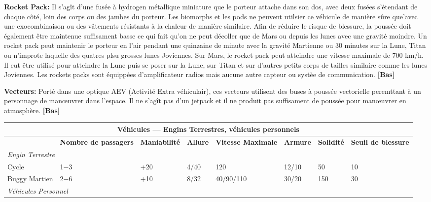 {\textbf{Rocket Pack:} Il s'agît d'une fusée à hydrogen métallique miniature que le porteur attache dans son dos, avec deux fusées s'étendant de chaque côté, loin des corps ou des jambes du porteur. Les biomorphs et les pods ne peuvent utilsier ce véhicule de manière sûre que'avec une exocombinaison ou des vâtements résistants à la chaleur de manière similaire. Afin de réduire le risque de blessure, la poussée doit également être maintenue suffisament basse ce qui fait qu'on ne peut décoller que de Mars ou depuis les lunes avec une gravité moindre. Un rocket pack peut maintenir le porteur en l'air pendant une quinzaine de minute avec la gravité Martienne ou 30 minutes sur la Lune, Titan ou n'improte laquelle des quatres plsu grosses lunes Joviennes. Sur Mars, le rocket pack peut atteindre une vitesse maximale de 700 km/h. Il eut être utilisé pour atteindre la Lune puis se poser sur la Lune, sur Titan et sur d'autres petits corps de tailles similaire comme les lunes Joviennes. Les rockets packs sont équippées d'amplificateur radios mais aucune autre capteur ou systèe de communication. \textbf{[Bas]} 

\textbf{Vecteurs:} Porté dans une optique AEV (Activité Extra véhiculair), ces vecteurs utilisent des buses à poussée vectorielle peremttant à un personnage de manœuvrer dans l'espace. Il ne s'agît pas d'un jetpack et il ne produit pas suffisament de poussée pour manœuvrer en atmosphère. \textbf{[Bas]} 

\begin{table} \begin{tabularx}{\textwidth}{|l|X|X|X|X|X|X|X|} \hline

\multicolumn{8}{|c|}{\textbf{Véhicules --- Engins Terrestres, véhicules personnels}} \\ \hline

&\textbf{Nombre de passagers}	&\textbf{Maniabilité}	&\textbf{Allure}	&\textbf{Vitesse Maximale}	&\textbf{Armure}	&\textbf{Solidité}	&\textbf{Seuil de blessure} \\ \hline

\multicolumn{8}{|l|}{\emph{Engin Terrestre}} \\ \hline

Cycle	&1$-$3	&+20	&4/40	&120	&12/10	&50	&10 \\ \hline

Buggy Martien	&2$-$6	&+10	&8/32	&40/90/110	&30/20	&150	&30 \\ \hline

\multicolumn{8}{|l|}{\emph{Véhicules Personnel}} \\ \hline


\end{tabularx}
\end{table}}
